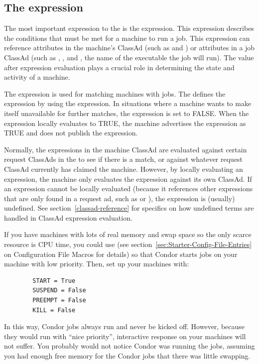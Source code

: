 

\subsection{\label{sec:Start-Expr}
The  expression}

The most important expression to the 
is the  expression.  
This expression describes the conditions that must be met for a
machine to run a job. 
This expression can reference attributes
in the machine's ClassAd (such as  and )
or attributes in a job ClassAd (such as
, , and , the name of the
executable the job will run).
The value after  expression evaluation plays a crucial role in
determining the state and activity of a machine.

The  expression is used for
matching machines with jobs.
The  defines the
 expression by using the  expression.
In situations where a machine wants to make itself
unavailable for further matches, the 
expression is set to FALSE.  
When the  expression locally evaluates to TRUE, the
machine advertises the  expression as TRUE and
does not publish the  expression.

Normally, the expressions in the machine ClassAd are evaluated against
certain request ClassAds in the  to see if there is
a match, or against whatever request ClassAd currently has claimed the
machine.  However, by locally evaluating an expression, the machine only
evaluates the expression against its own ClassAd.  If an expression
cannot be locally evaluated (because it references other expressions
that are only found in a request ad, such as  or
), the expression is (usually) undefined.
See section~\ref{classad-reference} for specifics on
how undefined terms are handled in ClassAd expression evaluation. 

\Note If you have machines with lots of real memory and swap space so
  the only scarce resource is CPU time, you could use
   (see
  section~\ref{sec:Starter-Config-File-Entries} on 
  Configuration File Macros for details) so that Condor starts jobs on
  your machine with low priority.
  Then, set up your machines with:
\begin{verbatim}
        START = True
        SUSPEND = False
        PREEMPT = False
        KILL = False
\end{verbatim}
  In this way, Condor jobs always run and never be kicked off. 
  However, because they would run with ``nice priority'', interactive 
  response on your machines will not suffer.
  You probably would not notice Condor was running the jobs, 
  assuming you had enough free memory for the Condor jobs that there
  was little swapping.


